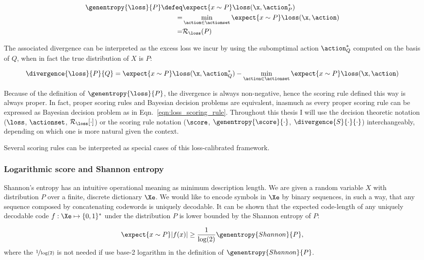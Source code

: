 \begin{align}
	\genentropy{\loss}{P} \defeq &\expect{x\sim P} \loss(\x,\action^{*}_{P})\\
		= &\min_{\action\in\actionset} \expect{x\sim P} \loss(\x,\action)\\
		= &\mathcal{R}_{\loss}(P)
\end{align}

The associated divergence can be interpreted as the excess loss we incur by using the subomptimal action $\action^{*}_{Q}$ computed on the basis of $Q$, when in fact the true distribution of $X$ is $P$:

\begin{align}
	\divergence{\loss}{P}{Q} = \expect{x\sim P} \loss(\x,\action^{*}_{Q}) - \min_{\action \in \actionset}\expect{x\sim P} \loss(\x,\action)
\end{align}

Because of the definition of $\genentropy{\loss}{P}$, the divergence is always non-negative, hence the scoring rule defined this way is always proper. In fact, proper scoring rules and Bayesian decision problems are equivalent, inasmuch as every proper scoring rule can be expressed as Bayesian decision problem as in Eqn.\ \eqref{eqn:loss_scoring_rule}. Throughout this thesis I will use the decision theoretic notation ($\loss$, $\actionset$, $\mathcal{R}_{\loss}[\cdot]$) or the scoring rule notation ($\score$, $\genentropy{\score}{\cdot}$, $\divergence{S}{\cdot}{\cdot}$) interchangeably, depending on which one is more natural given the context.

Several scoring rules can be interpreted as special cases of this loss-calibrated framework.

\subsubsection{Logarithmic score and Shannon entropy}

Shannon's entropy has an intuitive operational meaning as minimum description length. We are given a random variable $X$ with distribution $P$ over a finite, discrete dictionary $\Xe$. We would like to encode symbols in $\Xe$ by binary sequences, in such a way, that any sequence composed by concatenating codewords is uniquely decodable. It can be shown that the expected code-length of any uniquely decodable code $f:\Xe\mapsto\{0,1\}^{*}$ under the distribution $P$ is lower bounded by the Shannon entropy of $P$:

\begin{equation}
	\expect{x \sim P} \vert f(x) \vert \geq \frac{1}{\log(2)}\genentropy{Shannon}{P},
\end{equation}
where the $\nicefrac{1}{\log(2)}$ is not needed if use base-2 logarithm in the definition of $\genentropy{Shannon}{P}$.
 
